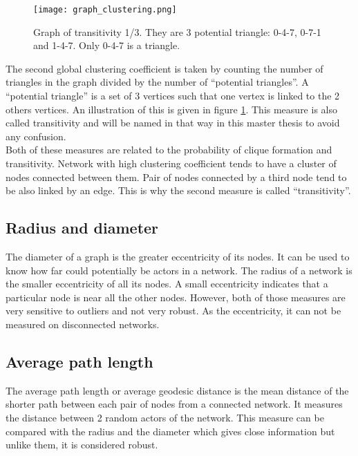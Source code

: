 \documentclass[a4paper, 12pt]{report}
\begin{document}
\begin{figure}
\centering
\texttt{[image: graph\_clustering.png]}
\caption{Graph of transitivity 1/3. They are 3 potential triangle: 0-4-7, 0-7-1 and 1-4-7. Only 0-4-7 is a triangle. }
\label{transitivity}
\end{figure}

The second global clustering coefficient is taken by counting the number of triangles in the graph divided by the number of ``potential triangles''. A ``potential triangle'' is a set of 3 vertices such that one vertex is linked to the 2 others vertices. An illustration of this is given in figure \ref{transitivity}. This measure is also called transitivity and will be named in that way in this master thesis to avoid any confusion. \\

Both of these measures are related to the probability of clique formation and transitivity. Network with high clustering coefficient tends to have a cluster of nodes connected between them. Pair of nodes connected by a third node tend to be also linked by an edge. This is why the second measure is called ``transitivity''.\\

\subsection{Radius and diameter}
The diameter of a graph is the greater eccentricity of its nodes. It can be used to know how far could potentially be actors in a network. The radius of a network is the smaller eccentricity of all its nodes. A small eccentricity indicates that a particular node is near all the other nodes. However, both of those measures are very sensitive to outliers and not very robust. As the eccentricity, it can not be measured on disconnected networks.

\subsection{Average path length}
The average path length \citep{path_length} or average geodesic distance is the mean distance of the shorter path between each pair of nodes from a connected network. It measures the distance between 2 random actors of the network. This measure can be compared with the radius and the diameter which gives close information but unlike them, it is considered robust.
\end{document}
